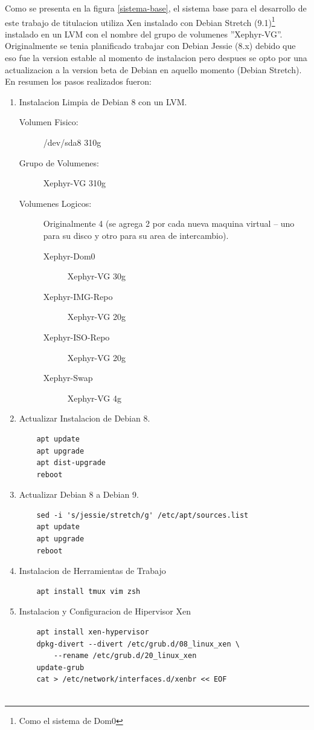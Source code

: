 Como se presenta en la figura \ref{sistema-base}, el sistema base para el desarrollo de este trabajo de titulacion utiliza Xen instalado con Debian Stretch (9.1)\footnote{Como el sistema de Dom0} instalado en un LVM con el nombre del grupo de volumenes ''Xephyr-VG''. Originalmente se tenia planificado trabajar con Debian Jessie (8.x) debido que eso fue la version estable al momento de instalacion pero despues se opto por una actualizacion a la version beta de Debian en aquello momento (Debian Stretch). En resumen los pasos realizados fueron:
\lstset{language=Bash}
\begin{enumerate}
	\item Instalacion Limpia de Debian 8 con un LVM.
    	\begin{description}
    		\item[Volumen Fisico:] /dev/sda8 310g 
            \item[Grupo de Volumenes:] Xephyr-VG 310g
            \item[Volumenes Logicos:] Originalmente 4 (se agrega 2 por cada nueva maquina virtual -- uno para su disco y otro para su area de intercambio).
            \begin{description}
            	\item[Xephyr-Dom0] Xephyr-VG 30g
                \item[Xephyr-IMG-Repo] Xephyr-VG 20g
                \item[Xephyr-ISO-Repo] Xephyr-VG 20g
                \item[Xephyr-Swap] Xephyr-VG 4g
            \end{description}
    	\end{description}
    \item Actualizar Instalacion de Debian 8.
    	\begin{lstlisting}
	apt update
	apt upgrade
	apt dist-upgrade
	reboot
        \end{lstlisting}
    \item Actualizar Debian 8 a Debian 9.
        \begin{lstlisting}
	sed -i 's/jessie/stretch/g' /etc/apt/sources.list
	apt update
	apt upgrade
	reboot
        \end{lstlisting}
    \item Instalacion de Herramientas de Trabajo
        \begin{lstlisting}
	apt install tmux vim zsh
        \end{lstlisting}
    \item Instalacion y Configuracion de Hipervisor Xen
		\begin{lstlisting}
	apt install xen-hypervisor
	dpkg-divert --divert /etc/grub.d/08_linux_xen \
		--rename /etc/grub.d/20_linux_xen
	update-grub
	cat > /etc/network/interfaces.d/xenbr << EOF


\end{lstlisting}
\end{enumerate}
